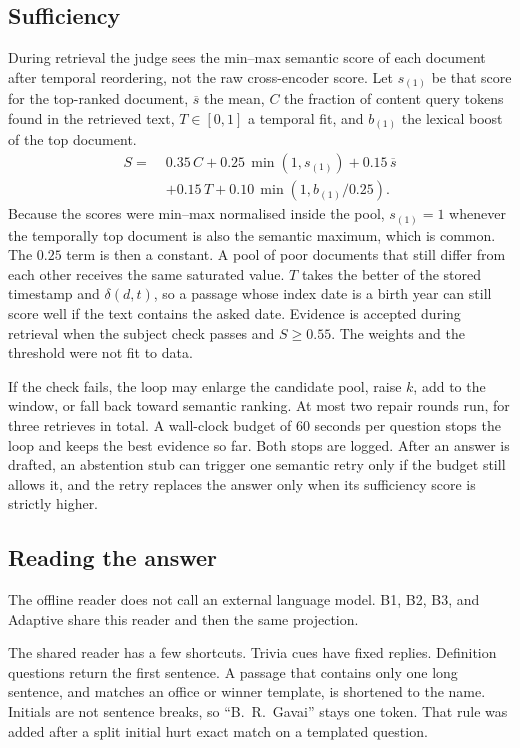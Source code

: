 \documentclass[11pt]{article}
\begin{document}
\subsection{Sufficiency}

During retrieval the judge sees the min--max semantic score of each document after temporal reordering, not the raw cross-encoder score.
Let $s_{(1)}$ be that score for the top-ranked document, $\overline{s}$ the mean, $C$ the fraction of content query tokens found in the retrieved text, $T\in[0,1]$ a temporal fit, and $b_{(1)}$ the lexical boost of the top document.
\begin{equation}
\begin{aligned}
S =\;& 0.35\,C + 0.25\,\min(1, s_{(1)}) + 0.15\,\overline{s}\\
&+ 0.15\,T + 0.10\,\min(1, b_{(1)}/0.25).
\end{aligned}
\label{eq:suff}
\end{equation}
Because the scores were min--max normalised inside the pool, $s_{(1)}=1$ whenever the temporally top document is also the semantic maximum, which is common.
The $0.25$ term is then a constant.
A pool of poor documents that still differ from each other receives the same saturated value.
$T$ takes the better of the stored timestamp and $\delta(d,t)$, so a passage whose index date is a birth year can still score well if the text contains the asked date.
Evidence is accepted during retrieval when the subject check passes and $S\ge 0.55$.
The weights and the threshold were not fit to data.

If the check fails, the loop may enlarge the candidate pool, raise $k$, add to the window, or fall back toward semantic ranking.
At most two repair rounds run, for three retrieves in total.
A wall-clock budget of 60 seconds per question stops the loop and keeps the best evidence so far.
Both stops are logged.
After an answer is drafted, an abstention stub can trigger one semantic retry only if the budget still allows it, and the retry replaces the answer only when its sufficiency score is strictly higher.

\subsection{Reading the answer}
\label{sec:reader}

The offline reader does not call an external language model.
B1, B2, B3, and Adaptive share this reader and then the same projection.

The shared reader has a few shortcuts.
Trivia cues have fixed replies.
Definition questions return the first sentence.
A passage that contains only one long sentence, and matches an office or winner template, is shortened to the name.
Initials are not sentence breaks, so ``B.\ R.\ Gavai'' stays one token.
That rule was added after a split initial hurt exact match on a templated question.
\end{document}
